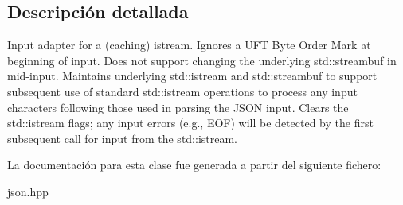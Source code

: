 \subsection{Descripción detallada}
Input adapter for a (caching) istream. Ignores a U\+FT Byte Order Mark at beginning of input. Does not support changing the underlying std\+::streambuf in mid-\/input. Maintains underlying std\+::istream and std\+::streambuf to support subsequent use of standard std\+::istream operations to process any input characters following those used in parsing the J\+S\+ON input. Clears the std\+::istream flags; any input errors (e.\+g., E\+OF) will be detected by the first subsequent call for input from the std\+::istream. 

La documentación para esta clase fue generada a partir del siguiente fichero\+:\begin{DoxyCompactItemize}
\item 
json.\+hpp\end{DoxyCompactItemize}
